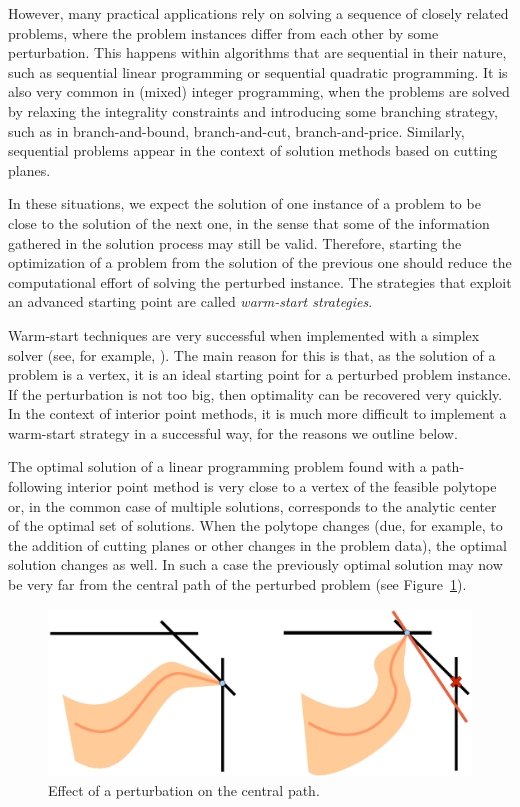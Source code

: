 However, many practical applications rely on solving a sequence 
of closely related problems, where the problem instances differ 
from each other by some 
perturbation. This happens within algorithms that are sequential 
in their nature, such as sequential linear programming or
sequential quadratic programming.
It is also very common in (mixed) integer programming, when the
problems are solved by relaxing the integrality constraints and
introducing some branching strategy, such as in branch-and-bound,
branch-and-cut, branch-and-price.
Similarly, sequential problems appear in the context of solution 
methods based on cutting planes.

In these situations, we expect the solution of one instance of a problem to be 
close to the solution of the next one, in the sense that some of
the information gathered in the solution process may still be valid. 
Therefore, starting the 
optimization of a problem from the solution of the previous one
should reduce the computational effort of solving the perturbed instance.
The strategies that exploit an advanced starting point are called
{\em warm-start strategies}.

Warm-start techniques are very successful 
when implemented with a simplex solver (see, for example, 
\cite{Bixby02}). 
The main reason for this is that, as the solution of a problem
is a vertex, it is an ideal starting point for a perturbed problem instance.
If the perturbation is not too big, then optimality can be recovered
very quickly.
In the context of interior point methods, it 
is much more difficult to implement a warm-start strategy in a
successful way, for the reasons
we outline below.

The optimal solution of a linear programming problem found with 
a path-following interior point method is very close to a vertex of 
the feasible polytope or, in the common case of multiple solutions, 
corresponds to the analytic center of the optimal set of solutions.
When the polytope changes (due, for example,
to the addition of cutting planes or other changes in the 
problem data), the optimal solution changes as well.
In such a case the previously optimal solution may now be very far
from the central path of the perturbed problem
(see Figure~\ref{fig:ws-path}).

\begin{figure}[ht]
\centering
\includegraphics[scale=0.75]{figures/ws-path.eps}
\caption{Effect of a perturbation on the central path.}
\label{fig:ws-path}
\end{figure}

